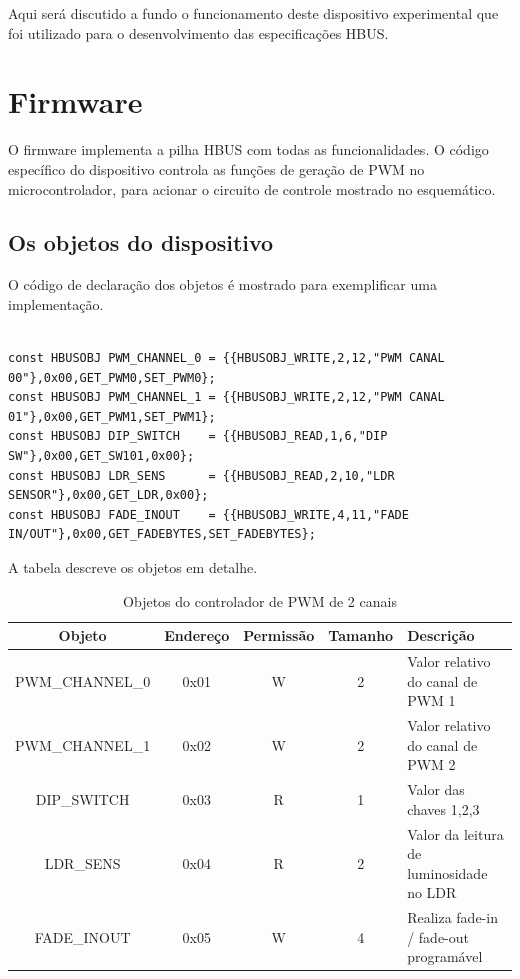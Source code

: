 Aqui será discutido a fundo o funcionamento deste dispositivo experimental que foi utilizado para o desenvolvimento das especificações HBUS.

\section{Firmware}

O firmware implementa a pilha HBUS com todas as funcionalidades. O código específico do dispositivo controla as funções de geração de PWM no microcontrolador, para acionar o circuito de controle mostrado no esquemático.

\subsection{Os objetos do dispositivo}

O código de declaração dos objetos é mostrado para exemplificar uma implementação.

\begin{verbatim}

const HBUSOBJ PWM_CHANNEL_0 = {{HBUSOBJ_WRITE,2,12,"PWM CANAL 00"},0x00,GET_PWM0,SET_PWM0};
const HBUSOBJ PWM_CHANNEL_1 = {{HBUSOBJ_WRITE,2,12,"PWM CANAL 01"},0x00,GET_PWM1,SET_PWM1};
const HBUSOBJ DIP_SWITCH    = {{HBUSOBJ_READ,1,6,"DIP SW"},0x00,GET_SW101,0x00};
const HBUSOBJ LDR_SENS      = {{HBUSOBJ_READ,2,10,"LDR SENSOR"},0x00,GET_LDR,0x00};
const HBUSOBJ FADE_INOUT	= {{HBUSOBJ_WRITE,4,11,"FADE IN/OUT"},0x00,GET_FADEBYTES,SET_FADEBYTES};

\end{verbatim}

A tabela descreve os objetos em detalhe.

\begin{table}[H]
\centering
\caption{Objetos do controlador de PWM de 2 canais}
\begin{tabular}{c c c c p{6cm}}
\hline
Objeto			&	Endereço		&	Permissão	&	Tamanho	& Descrição\\
\hline
PWM\_CHANNEL\_0	&	0x01			&	W			&	2		& Valor relativo do canal de PWM 1\\
PWM\_CHANNEL\_1 &	0x02			&	W			&	2		& Valor relativo do canal de PWM 2\\
DIP\_SWITCH		&	0x03			&	R			&	1		& Valor das chaves 1,2,3\\
LDR\_SENS		&	0x04			&	R			&	2		& Valor da leitura de luminosidade no LDR\\
FADE\_INOUT		&	0x05			&	W			&	4		& Realiza fade-in / fade-out programável\\
\hline
\end{tabular}
\end{table}

